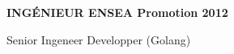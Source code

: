 \documentclass[11pt,a4paper, final]{cv}
\begin{document}
\begin{center}
    \textbf{INGÉNIEUR ENSEA Promotion 2012}
    \vspace{3mm}
\end{center}

\begin{heading}

\end{heading}

\begin{objective}
    Senior Ingeneer Developper (Golang)
\end{objective}
\end{document}
